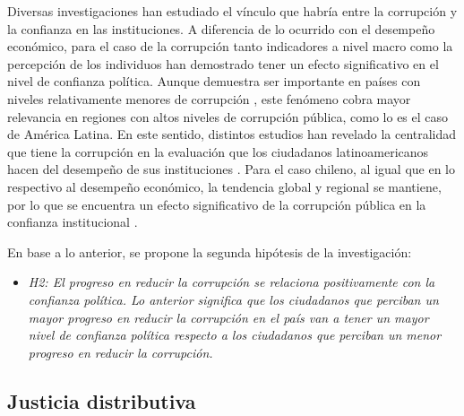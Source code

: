 \documentclass[12pt,twoside]{templates/facsothesis}
\providecommand{\tightlist}{%
  \setlength{\itemsep}{0pt}\setlength{\parskip}{0pt}}
\begin{document}
Diversas investigaciones han estudiado el vínculo que habría entre la corrupción y la confianza en las instituciones. A diferencia de lo ocurrido con el desempeño económico, para el caso de la corrupción tanto indicadores a nivel macro como la percepción de los individuos han demostrado tener un efecto significativo en el nivel de confianza política. Aunque demuestra ser importante en países con niveles relativamente menores de corrupción \citep{andersonCorruptionPoliticalAllegiances2003, vandermeerPoliticalTrustEvaluation2017, wangGovernmentPerformanceCorruption2016}, este fenómeno cobra mayor relevancia en regiones con altos niveles de corrupción pública, como lo es el caso de América Latina. En este sentido, distintos estudios han revelado la centralidad que tiene la corrupción en la evaluación que los ciudadanos latinoamericanos hacen del desempeño de sus instituciones \citep{boothLegitimacyPuzzleLatin2009, mainwaringStateDeficienciesParty2006, morrisCorruptionTrustTheoretical2010, seligsonImpactCorruptionRegime2002a, stoyanTrustGovernmentInstitutions2016}. Para el caso chileno, al igual que en lo respectivo al desempeño económico, la tendencia global y regional se mantiene, por lo que se encuentra un efecto significativo de la corrupción pública en la confianza institucional \citep{riffoQueInfluyeConfianza2019, saldanazunigaConfianzaInstitucionesPoliticas2019, segoviaMalaiseDemocracyChile2016}.

En base a lo anterior, se propone la segunda hipótesis de la investigación:

\begin{itemize}
\tightlist
\item
  \emph{H2: El progreso en reducir la corrupción se relaciona positivamente con la confianza política. Lo anterior significa que los ciudadanos que perciban un mayor progreso en reducir la corrupción en el país van a tener un mayor nivel de confianza política respecto a los ciudadanos que perciban un menor progreso en reducir la corrupción.}
\end{itemize}

\subsection{Justicia distributiva}\label{justicia-distributiva}
\end{document}
